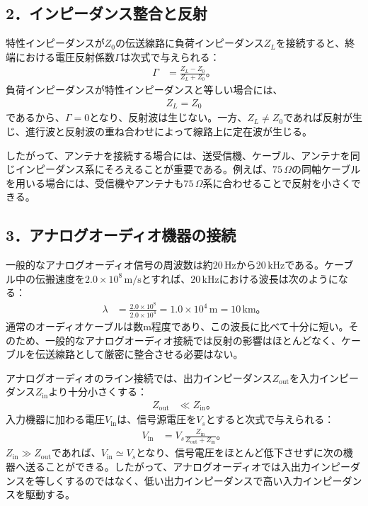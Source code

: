 \documentclass[platex,dvipdfmx,a4paper]{jsarticle}
\begin{document}
\subsection*{2．インピーダンス整合と反射}

特性インピーダンスが$Z_0$の伝送線路に負荷インピーダンス$Z_L$を接続すると、終端における電圧反射係数$\Gamma$は次式で与えられる：
\begin{align*}
  \Gamma
  &=\frac{Z_L-Z_0}{Z_L+Z_0}。
\end{align*}
負荷インピーダンスが特性インピーダンスと等しい場合には、
\begin{align*}
  Z_L=Z_0
\end{align*}
であるから、$\Gamma=0$となり、反射波は生じない。一方、$Z_L\neq Z_0$であれば反射が生じ、進行波と反射波の重ね合わせによって線路上に定在波が生じる。

したがって、アンテナを接続する場合には、送受信機、ケーブル、アンテナを同じインピーダンス系にそろえることが重要である。例えば、$75\,\Omega$の同軸ケーブルを用いる場合には、受信機やアンテナも$75\,\Omega$系に合わせることで反射を小さくできる。

\subsection*{3．アナログオーディオ機器の接続}

一般的なアナログオーディオ信号の周波数は約$20\,\mathrm{Hz}$から$20\,\mathrm{kHz}$である。ケーブル中の伝搬速度を$2.0\times10^8\,\mathrm{m/s}$とすれば、$20\,\mathrm{kHz}$における波長は次のようになる：
\begin{align*}
  \lambda
  &=\frac{2.0\times10^8}{2.0\times10^4}
   =1.0\times10^4\,\mathrm{m}
   =10\,\mathrm{km}。
\end{align*}
通常のオーディオケーブルは数$\mathrm{m}$程度であり、この波長に比べて十分に短い。そのため、一般的なアナログオーディオ接続では反射の影響はほとんどなく、ケーブルを伝送線路として厳密に整合させる必要はない。

アナログオーディオのライン接続では、出力インピーダンス$Z_{\mathrm{out}}$を入力インピーダンス$Z_{\mathrm{in}}$より十分小さくする：
\begin{align*}
  Z_{\mathrm{out}}
  &\ll Z_{\mathrm{in}}。
\end{align*}
入力機器に加わる電圧$V_{\mathrm{in}}$は、信号源電圧を$V_s$とすると次式で与えられる：
\begin{align*}
  V_{\mathrm{in}}
  &=V_s\frac{Z_{\mathrm{in}}}
  {Z_{\mathrm{out}}+Z_{\mathrm{in}}}。
\end{align*}
$Z_{\mathrm{in}}\gg Z_{\mathrm{out}}$であれば、$V_{\mathrm{in}}\simeq V_s$となり、信号電圧をほとんど低下させずに次の機器へ送ることができる。したがって、アナログオーディオでは入出力インピーダンスを等しくするのではなく、低い出力インピーダンスで高い入力インピーダンスを駆動する。
\end{document}

